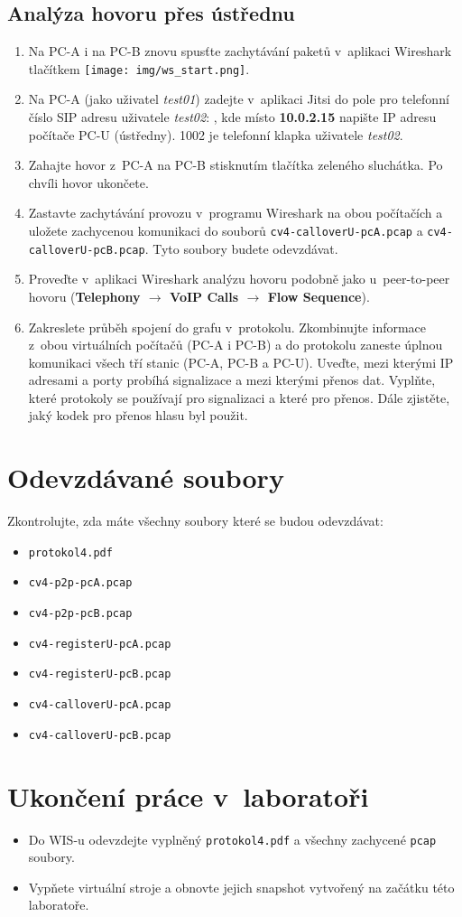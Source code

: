 \subsection{Analýza hovoru přes ústřednu}
\begin{enumerate}
    \item Na PC-A i na PC-B znovu spusťte zachytávání paketů v aplikaci Wireshark tlačítkem \texttt{[image: img/ws\_start.png]}.
    \item Na PC-A (jako uživatel \emph{test01}) zadejte v~aplikaci Jitsi do pole pro telefonní číslo SIP adresu uživatele \emph{test02}: , kde místo {\bf 10.0.2.15} napište IP adresu počítače PC-U (ústředny). 1002 je telefonní klapka uživatele \emph{test02}.
    \item Zahajte hovor z~PC-A na PC-B stisknutím tlačítka zeleného sluchátka. Po chvíli hovor ukončete.
	\item Zastavte zachytávání provozu v~programu Wireshark na obou počítačích a uložete zachycenou komunikaci do souborů \texttt{cv4-calloverU-pcA.pcap} a \texttt{cv4-calloverU-pcB.pcap}. Tyto soubory budete odevzdávat.
	\item Proveďte v~aplikaci Wireshark analýzu hovoru podobně jako u~peer-to-peer hovoru ({\bf Telephony $\rightarrow$ VoIP Calls $\rightarrow$ \bf Flow Sequence}).
    \item Zakreslete průběh spojení do grafu v~protokolu. Zkombinujte informace z~obou virtuálních počítačů (PC-A i PC-B) a do protokolu zaneste úplnou komunikaci všech
      tří stanic (PC-A, PC-B a PC-U). Uveďte, mezi kterými IP adresami a porty probíhá signalizace a mezi kterými přenos dat. Vyplňte, které protokoly se používají pro signalizaci a které pro přenos. Dále zjistěte, jaký kodek pro přenos hlasu byl použit.
\end{enumerate}


\section*{Odevzdávané soubory}
Zkontrolujte, zda máte všechny soubory které se budou odevzdávat:
\begin{itemize}
  \item \texttt{protokol4.pdf}
  \item \texttt{cv4-p2p-pcA.pcap}
  \item \texttt{cv4-p2p-pcB.pcap}
  \item \texttt{cv4-registerU-pcA.pcap}
  \item \texttt{cv4-registerU-pcB.pcap}
  \item \texttt{cv4-calloverU-pcA.pcap}
  \item \texttt{cv4-calloverU-pcB.pcap}
\end{itemize}

\section*{Ukončení práce v~laboratoři}
\begin{itemize}
	\item Do WIS-u odevzdejte vyplněný \texttt{protokol4.pdf} a všechny zachycené \texttt{pcap} soubory.
	\item Vypňete virtuální stroje a obnovte jejich snapshot vytvořený na začátku této laboratoře.
\end{itemize}
